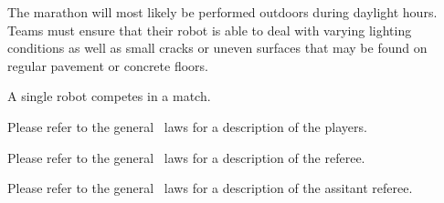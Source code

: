 \documentclass[12pt]{hurocup}
\begin{document}
\begin{decisions}

\item The marathon will most likely be performed outdoors during
  daylight hours. Teams must ensure that their robot is able to deal
  with varying lighting conditions as well as small cracks or uneven
  surfaces that may be found on regular pavement or concrete floors.

\end{decisions}


\begin{lawlist}[MR]
\item A single robot competes in a match.
\end{lawlist}


Please refer to the general \HuroCup\ laws for a description of
the players.


Please refer to the general \HuroCup\ laws for a description of
the referee.


Please refer to the general \HuroCup\ laws for a description of
the assitant referee.

\end{document}
